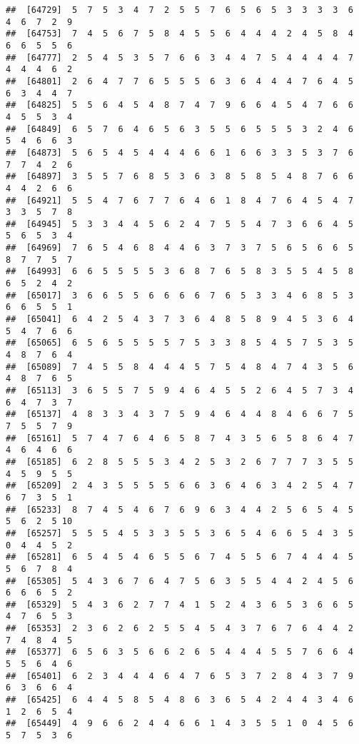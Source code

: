 \documentclass[
]{book}
\begin{document}
\begin{verbatim}
##  [64729]  5  7  5  3  4  7  2  5  5  7  6  5  6  5  3  3  3  3  6  4  6  7  2  9
##  [64753]  7  4  5  6  7  5  8  4  5  5  6  4  4  4  2  4  5  8  4  6  6  5  5  6
##  [64777]  2  5  4  5  3  5  7  6  6  3  4  4  7  5  4  4  4  4  7  4  4  4  6  2
##  [64801]  2  6  4  7  7  6  5  5  5  6  3  6  4  4  4  7  6  4  5  6  3  4  4  7
##  [64825]  5  5  6  4  5  4  8  7  4  7  9  6  6  4  5  4  7  6  6  4  5  5  3  4
##  [64849]  6  5  7  6  4  6  5  6  3  5  5  6  5  5  5  3  2  4  6  5  4  6  6  3
##  [64873]  5  6  5  4  5  4  4  4  6  6  1  6  6  3  3  5  3  7  6  7  7  4  2  6
##  [64897]  3  5  5  7  6  8  5  3  6  3  8  5  8  5  4  8  7  6  6  4  4  2  6  6
##  [64921]  5  5  4  7  6  7  7  6  4  6  1  8  4  7  6  4  5  4  7  3  3  5  7  8
##  [64945]  5  3  3  4  4  5  6  2  4  7  5  5  4  7  3  6  6  4  5  5  6  5  3  4
##  [64969]  7  6  5  4  6  8  4  4  6  3  7  3  7  5  6  5  6  6  5  8  7  7  5  7
##  [64993]  6  6  5  5  5  5  3  6  8  7  6  5  8  3  5  5  4  5  8  6  5  2  4  2
##  [65017]  3  6  6  5  5  6  6  6  6  7  6  5  3  3  4  6  8  5  3  6  6  5  5  1
##  [65041]  6  4  2  5  4  3  7  3  6  4  8  5  8  9  4  5  3  6  4  5  4  7  6  6
##  [65065]  6  5  6  5  5  5  5  7  5  3  3  8  5  4  5  7  5  3  5  4  8  7  6  4
##  [65089]  7  4  5  5  8  4  4  4  5  7  5  4  8  4  7  4  3  5  6  4  8  7  6  5
##  [65113]  3  6  5  5  7  5  9  4  6  4  5  5  2  6  4  5  7  3  4  6  4  7  3  7
##  [65137]  4  8  3  3  4  3  7  5  9  4  6  4  4  8  4  6  6  7  5  7  5  5  7  9
##  [65161]  5  7  4  7  6  4  6  5  8  7  4  3  5  6  5  8  6  4  7  4  6  4  6  6
##  [65185]  6  2  8  5  5  5  3  4  2  5  3  2  6  7  7  7  3  5  5  4  5  9  5  5
##  [65209]  2  4  3  5  5  5  5  6  6  3  6  4  6  3  4  2  5  4  7  6  7  3  5  1
##  [65233]  8  7  4  5  4  6  7  6  9  6  3  4  4  2  5  6  5  4  5  5  6  2  5 10
##  [65257]  5  5  5  4  5  3  3  5  5  3  6  5  4  6  6  5  4  3  5  0  4  4  5  2
##  [65281]  6  5  4  5  4  6  5  5  6  7  4  5  5  6  7  4  4  4  5  5  6  7  8  4
##  [65305]  5  4  3  6  7  6  4  7  5  6  3  5  5  4  4  2  4  5  6  6  6  6  5  2
##  [65329]  5  4  3  6  2  7  7  4  1  5  2  4  3  6  5  3  6  6  5  4  7  6  5  3
##  [65353]  2  3  6  2  6  2  5  5  4  5  4  3  7  6  7  6  4  4  2  7  4  8  4  5
##  [65377]  6  5  6  3  5  6  6  2  6  5  4  4  4  5  5  7  6  6  4  5  5  6  4  6
##  [65401]  6  2  3  4  4  4  6  4  7  6  5  3  7  2  8  4  3  7  9  6  3  6  6  4
##  [65425]  6  4  4  5  8  5  4  8  6  3  6  5  4  2  4  4  3  4  6  1  2  6  5  4
##  [65449]  4  9  6  6  2  4  4  6  6  1  4  3  5  5  1  0  4  5  6  5  7  5  3  6

\end{verbatim}
\end{document}
